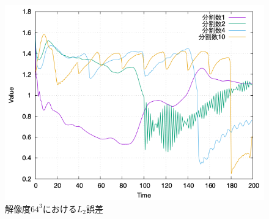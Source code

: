 \documentclass[a4j,12pt]{jreport}
\begin{document}

\begin{figure}[htbp]
\centering
\includegraphics[width=140mm]{images/64error.png}
\caption{$解像度64^3におけるL_2誤差$}
\label{fig:64error}
\end{figure}
\end{document}

